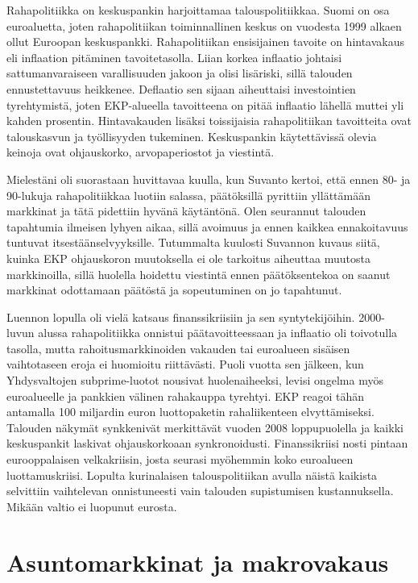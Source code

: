 \documentclass[12pt]{article}
\begin{document}
Rahapolitiikka on keskuspankin harjoittamaa talouspolitiikkaa. Suomi on osa
euroaluetta, joten rahapolitiikan toiminnallinen keskus on vuodesta 1999 alkaen
ollut Euroopan keskuspankki. Rahapolitiikan ensisijainen tavoite on hintavakaus
eli inflaation pitäminen tavoitetasolla. Liian korkea inflaatio johtaisi
sattumanvaraiseen varallisuuden jakoon ja olisi lisäriski, sillä talouden
ennustettavuus heikkenee. Deflaatio sen sijaan aiheuttaisi investointien
tyrehtymistä, joten EKP-alueella tavoitteena on pitää inflaatio lähellä muttei
yli kahden prosentin. Hintavakauden lisäksi toissijaisia rahapolitiikan
tavoitteita ovat talouskasvun ja työllisyyden tukeminen. Keskuspankin
käytettävissä olevia keinoja ovat ohjauskorko, arvopaperiostot ja viestintä.

Mielestäni oli suorastaan huvittavaa kuulla, kun Suvanto kertoi, että ennen 80-
ja 90-lukuja rahapolitiikkaa luotiin salassa, päätöksillä pyrittiin yllättämään
markkinat ja tätä pidettiin hyvänä käytäntönä. Olen seurannut talouden
tapahtumia ilmeisen lyhyen aikaa, sillä avoimuus ja ennen kaikkea ennakoitavuus
tuntuvat itsestäänselvyyksille. Tutummalta kuulosti Suvannon kuvaus siitä,
kuinka EKP ohjauskoron muutoksella ei ole tarkoitus aiheuttaa muutosta
markkinoilla, sillä huolella hoidettu viestintä ennen päätöksentekoa on saanut
markkinat odottamaan päätöstä ja sopeutuminen on jo tapahtunut.

Luennon lopulla oli vielä katsaus finanssikriisiin ja sen syntytekijöihin.
2000-luvun alussa rahapolitiikka onnistui päätavoitteessaan ja inflaatio oli
toivotulla tasolla, mutta rahoitusmarkkinoiden vakauden tai euroalueen sisäisen
vaihtotaseen eroja ei huomioitu riittävästi. Puoli vuotta sen jälkeen, kun
Yhdysvaltojen subprime-luotot nousivat huolenaiheeksi, levisi ongelma myös
euroalueelle ja pankkien välinen rahakauppa tyrehtyi. EKP reagoi tähän
antamalla 100 miljardin euron luottopaketin rahaliikenteen elvyttämiseksi.
Talouden näkymät synkkenivät merkittävät vuoden 2008 loppupuolella ja kaikki
keskuspankit laskivat ohjauskorkoaan synkronoidusti. Finanssikriisi nosti
pintaan eurooppalaisen velkakriisin, josta seurasi myöhemmin koko euroalueen
luottamuskriisi. Lopulta kurinalaisen talouspolitiikan avulla näistä kaikista
selvittiin vaihtelevan onnistuneesti vain talouden supistumisen kustannuksella.
Mikään valtio ei luopunut eurosta.


\newpage
\section{Asuntomarkkinat ja makrovakaus}
\end{document}
